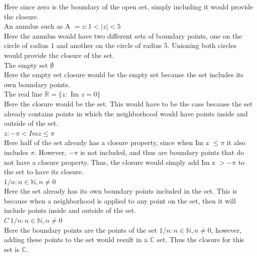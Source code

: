 \documentclass[12pt]{article}
\begin{document}
Here since zero is the boundary of the open set, simply including it would provide the closure.\\

 An annulus such as A $ = {z: 1 < |z| < 5}$\\

Here the annulus would have two different sets of boundary points, one on the circle of radius 1 and another on the circle of radius 5.
Unioning both circles would provide the closure of the set.\\

 The empty set $\emptyset$ \\

Here the empty set closure would be the empty set because the set includes its own boundary points.\\

 The real line $\mathbb{R} = \{z: $ Im $z = 0\}$\\

Here the closure would be the set.
This would have to be the case because the set already contains points in which the neighborhood would have points inside and outside of the set.\\

 ${z: -\pi < Im z \leq \pi}$\\

Here half of the set already has a closure property, since when Im z $ \leq \pi$ it also includes $\pi$. 
However, $-\pi$ is not included, and thus are boundary points that do not have a closure property. 
Thus, the closure would simply add Im z $> -\pi$ to the set to have its closure.\\

 ${1/n: n \in \mathbb{N}, n \neq 0}$\\

Here the set already has its own boundary points included in the set.
This is because when a neighborhood is applied to any point on the set, then it will include points inside and outside of the set.\\

 $C \ {1/n: n \in \mathbb{N}, n \neq 0}$\\

Here the boundary points are the points of the set ${1/n: n \in \mathbb{N}, n \neq 0}$, however, adding these points to the set would result in a $\mathbb{C}$ set.
Thus the closure for this set is $\mathbb{C}$.\\
\end{document}

